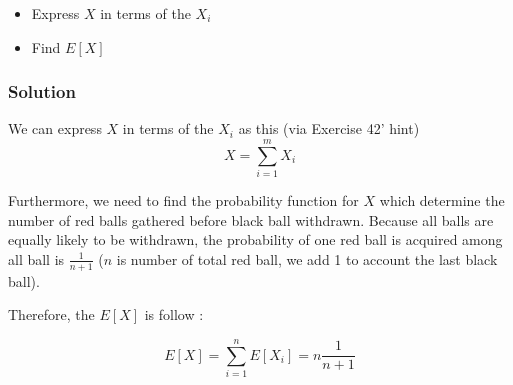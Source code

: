 \documentclass[12pt,a4paper]{article}
\begin{document}
\begin{itemize}
    \item Express $X$ in terms of the $X_i$
    \item Find $E[X]$
\end{itemize}

\subsubsection{Solution}

We can express $X$ in terms of the $X_i$ as this (via Exercise 42' hint)
\[
    X = \sum_{i=1}^mX_i
\]

Furthermore, we need to find the probability function for $X$ which determine the number of red balls gathered before black ball withdrawn. Because all balls are equally likely to be withdrawn, the probability of one red ball is acquired among all ball is $\frac{1}{n+1}$ ($n$ is number of total red ball, we add 1 to account the last black ball). 

Therefore, the $E[X]$ is follow :

\[
E[X] = \sum_{i=1}^n E[X_i] = n \frac{1}{n+1}
\]
\end{document}
